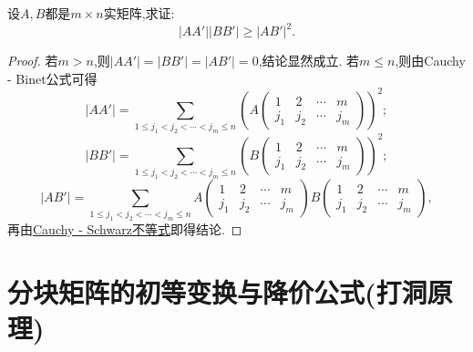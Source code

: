 \documentclass[lang=cn,newtx,10pt,scheme=chinese]{elegantbook}
\begin{document}
\begin{example}
    设\(A,B\)都是\(m\times n\)实矩阵,求证:
\[
|AA'||BB'|\geq|AB'|^2.
\]
\end{example}
\begin{proof}
    若\(m > n\),则\(|AA'| = |BB'| = |AB'| = 0\),结论显然成立.
    若\(m\leq n\),则由Cauchy - Binet公式可得
    \[
    |AA'|=\sum_{1\leq j_1<j_2<\cdots<j_m\leq n}\left(A\begin{pmatrix}
    1 & 2 & \cdots & m\\
    j_1 & j_2 & \cdots & j_m
    \end{pmatrix}\right)^2;
    \]
    \[
    |BB'|=\sum_{1\leq j_1<j_2<\cdots<j_m\leq n}\left(B\begin{pmatrix}
    1 & 2 & \cdots & m\\
    j_1 & j_2 & \cdots & j_m
    \end{pmatrix}\right)^2;
    \]
    \[
    |AB'|=\sum_{1\leq j_1<j_2<\cdots<j_m\leq n}A\begin{pmatrix}
    1 & 2 & \cdots & m\\
    j_1 & j_2 & \cdots & j_m
    \end{pmatrix}B\begin{pmatrix}
    1 & 2 & \cdots & m\\
    j_1 & j_2 & \cdots & j_m
    \end{pmatrix},
    \]
    再由\hyperref[theorem:Cauchy - Schwarz不等式]{Cauchy - Schwarz不等式}即得结论.
\end{proof}

\section{分块矩阵的初等变换与降价公式(打洞原理)}
\end{document}
